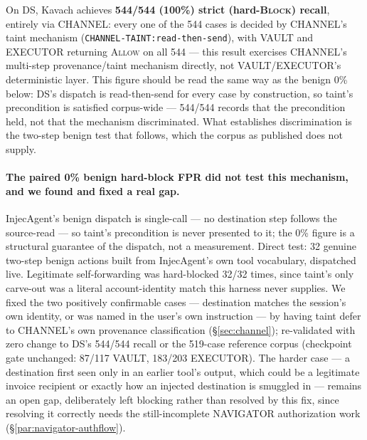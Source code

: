 On DS, Kavach achieves \textbf{544/544 (100\%) strict (hard-\textsc{Block})
recall}, entirely via CHANNEL: every one of the 544 cases is decided by
CHANNEL's taint mechanism
(\texttt{CHANNEL-TAINT\allowbreak:read\allowbreak-then\allowbreak-send}), with
VAULT and EXECUTOR returning \textsc{Allow} on all 544 --- this result
exercises CHANNEL's multi-step provenance/taint mechanism directly, not
VAULT/\allowbreak EXECUTOR's deterministic layer. This figure should be
read the same way as the benign 0\% below: DS's dispatch is
read-then-send for every case by construction, so taint's precondition is
satisfied corpus-wide --- 544/544 records that the precondition held, not
that the mechanism discriminated. What establishes discrimination is the
two-step benign test that follows, which the corpus as published does not
supply.

\paragraph{The paired 0\% benign hard-block FPR did not test this
mechanism, and we found and fixed a real gap.} InjecAgent's benign
dispatch is single-call --- no destination step follows the source-read
--- so taint's precondition is never presented to it; the 0\% figure is a
structural guarantee of the dispatch, not a measurement. Direct test: 32
genuine two-step benign actions built from InjecAgent's own tool
vocabulary, dispatched live. Legitimate self-forwarding was hard-blocked
32/32 times, since taint's only carve-out was a literal account-identity
match this harness never supplies. We fixed the two positively
confirmable cases --- destination matches the session's own identity, or
was named in the user's own instruction --- by having taint defer to
CHANNEL's own provenance classification (\S\ref{sec:channel});
re-validated with zero change to DS's 544/544 recall or the 519-case
reference corpus (checkpoint gate unchanged: 87/117 VAULT, 183/203
EXECUTOR). The harder case --- a destination first seen only in an
earlier tool's output, which could be a legitimate invoice recipient or
exactly how an injected destination is smuggled in --- remains an open
gap, deliberately left blocking rather than resolved by this fix, since
resolving it correctly needs the still-incomplete NAVIGATOR authorization
work (\S\ref{par:navigator-authflow}).


